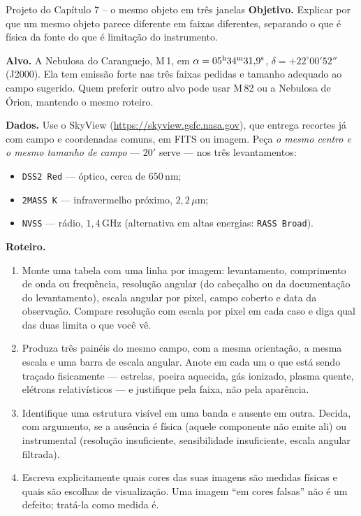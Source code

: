 \documentclass[11pt,a4paper]{article}
\begin{document}
\begin{lessonblock}[borderline west={2pt}{0pt}{astroGold}]{Projeto do Capítulo 7 -- o mesmo objeto em três janelas}
\textbf{Objetivo.} Explicar por que um mesmo objeto parece diferente em faixas diferentes, separando o que é
física da fonte do que é limitação do instrumento.

\textbf{Alvo.} A Nebulosa do Caranguejo, M\,1, em $\alpha=05^{\rm h}34^{\rm m}31{,}9^{\rm s}$,
$\delta=+22^\circ00'52''$ (J2000). Ela tem emissão forte nas três faixas pedidas e tamanho adequado ao campo
sugerido. Quem preferir outro alvo pode usar M\,82 ou a Nebulosa de Órion, mantendo o mesmo roteiro.

\textbf{Dados.} Use o SkyView (\url{https://skyview.gsfc.nasa.gov}), que entrega recortes já com campo e
coordenadas comuns, em FITS ou imagem. Peça \emph{o mesmo centro e o mesmo tamanho de campo} --- $20'$ serve ---
nos três levantamentos:
\begin{itemize}[itemsep=1pt]
\item \texttt{DSS2 Red} --- óptico, cerca de $650\,\mathrm{nm}$;
\item \texttt{2MASS K} --- infravermelho próximo, $2{,}2\,\mu\mathrm{m}$;
\item \texttt{NVSS} --- rádio, $1{,}4\,\mathrm{GHz}$ (alternativa em altas energias: \texttt{RASS Broad}).
\end{itemize}

\textbf{Roteiro.}
\begin{enumerate}[itemsep=2pt]
\item Monte uma tabela com uma linha por imagem: levantamento, comprimento de onda ou frequência, resolução
angular (do cabeçalho ou da documentação do levantamento), escala angular por pixel, campo coberto e data da
observação. Compare resolução com escala por pixel em cada caso e diga qual das duas limita o que você vê.
\item Produza três painéis do mesmo campo, com a mesma orientação, a mesma escala e uma barra de escala angular.
Anote em cada um o que está sendo traçado fisicamente --- estrelas, poeira aquecida, gás ionizado, plasma quente,
elétrons relativísticos --- e justifique pela faixa, não pela aparência.
\item Identifique uma estrutura visível em uma banda e ausente em outra. Decida, com argumento, se a ausência é
física (aquele componente não emite ali) ou instrumental (resolução insuficiente, sensibilidade insuficiente,
escala angular filtrada).
\item Escreva explicitamente quais cores das suas imagens são medidas físicas e quais são escolhas de
visualização. Uma imagem ``em cores falsas'' não é um defeito; tratá-la como medida é.
\end{enumerate}


\end{lessonblock}
\end{document}
